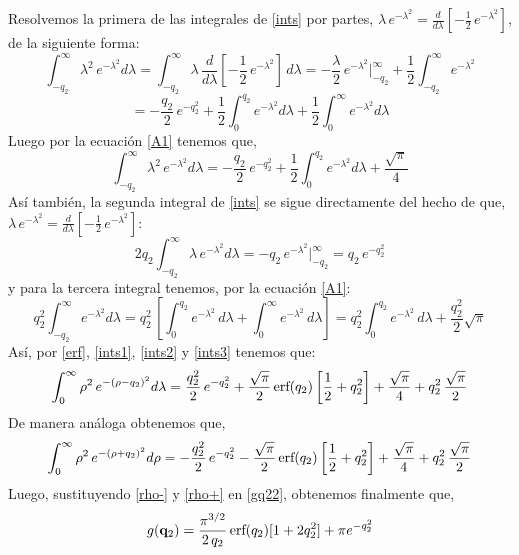 \documentclass[12pt]{book}
\numberwithin{equation}{chapter}
\def\q{\mathbf{q}}
\def\r{\rho}
\def\l{\lambda}
\def\erf{\hbox{erf}}
\begin{document}
Resolvemos la primera de las integrales de \eqref{ints} por partes,
$\l \, e^{-\l^{2}}= \frac{d}{d\l}\left[ -\frac{1}{2}\, e^{-\l^{2}} \right] $, de la siguiente forma:
$$ \int_{-q_{2}}^{\infty} \l^{2} \, e^{-\l^{2}} d\l = \int_{-q_{2}}^{\infty} \l \, \frac{d}{d\l}\left[ -\frac{1}{2}\, e^{-\l^{2}} \right]  \, d\l = -\frac{\l}{2}\, e^{-\l^{2}} \Big|_{-q_{2}}^{\infty} + \frac{1}{2} \int_{-q_{2}}^{\infty} e^{-\l^{2}} $$
$$ = -\frac{q_{2}}{2}\, e^{-q_{2}^{2}} + \frac{1}{2} \int_{0}^{q_{2}} e^{-\l^{2}} d\l + \frac{1}{2} \int_{0}^{\infty} e^{-\l^{2}} d\l $$
Luego por la ecuaci\'on \eqref{A1} tenemos que,
\begin{equation}\label{ints1}
\int_{-q_{2}}^{\infty} \l^{2} \, e^{-\l^{2}} d\l =  -\frac{q_{2}}{2}\, e^{-q_{2}^{2}} + \frac{1}{2} \int_{0}^{q_{2}} e^{-\l^{2}} d\l + \frac{\sqrt{\pi}}{4}
\end{equation}
As\'i tambi\'en, la segunda integral de \eqref{ints} se sigue directamente del hecho de que, $\l \, e^{-\l^{2}}= \frac{d}{d\l}\left[ -\frac{1}{2}\, e^{-\l^{2}} \right] $:
\begin{equation}\label{ints2}
2q_{2} \int_{-q_{2}}^{\infty} \l \, e^{-\l^{2}} d\l = - q_{2}\, e^{-\l^{2}} \Big|_{-q_{2}}^{\infty} = q_{2}\, e^{-q_{2}^{2}}
\end{equation}
y para la tercera integral tenemos, por la ecuaci\'on \eqref{A1}:
\begin{equation}\label{ints3}
q_{2}^{2} \int_{-q_{2}}^{\infty}  e^{-\l^{2}} d\l = q_{2}^{2}\, \left[ \int_{0}^{q_{2}} e^{-\l^{2}}\, d\l + \int_{0}^{\infty} e^{-\l^{2}}\, d\l \right]= q_{2}^{2} \int_{0}^{q_{2}} e^{-\l^{2}}\, d\l + \frac{q_{2}^{2}}{2} \sqrt{\pi} 
\end{equation}
As\'i, por \eqref{erf}, \eqref{ints1}, \eqref{ints2} y \eqref{ints3} tenemos que:
\begin{equation}\label{rho-}
\int_{0}^{\infty} \r^{2} \, e^{-(\r - q_{2})^{2}} d\l = \frac{q_{2}^{2}}{2} \, e^{-q_{2}^{2}} +\frac{\sqrt{\pi}}{2}\, \erf (q_{2}) \left[ \frac{1}{2}+q_{2}^{2} \right] + \frac{\sqrt{\pi}}{4}+ q_{2}^{2}\, \frac{\sqrt{\pi}}{2}
\end{equation}
De manera an\'aloga obtenemos que,
\begin{equation}\label{rho+}
\int_{0}^{\infty} \r^{2} \, e^{-(\r + q_{2})^{2}} d\r = -\frac{q_{2}^{2}}{2} \, e^{-q_{2}^{2}} -\frac{\sqrt{\pi}}{2}\, \erf (q_{2}) \left[ \frac{1}{2}+q_{2}^{2} \right] + \frac{\sqrt{\pi}}{4}+ q_{2}^{2}\, \frac{\sqrt{\pi}}{2}
\end{equation}
Luego, sustituyendo \eqref{rho-} y \eqref{rho+} en \eqref{gq22}, obtenemos finalmente que,
\begin{equation}\label{gq2-f}
g(\q_{2})= \frac{\pi^{3/2}}{2\,q_{2}}\, \erf (q_{2}) [ 1+2q_{2}^{2} ] + \pi e^{-q_{2}^{2}}
\end{equation}
\end{document}
